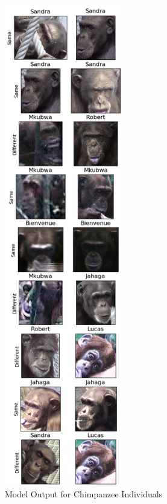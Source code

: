 \documentclass[11pt]{article}
\begin{document}
\begin{figure}
	\begin{center}
    \includegraphics[width=2.0in]{ChimpanzeeComparison.png}
  \caption{Model Output for Chimpanzee Individuals}
  	\end{center}
\end{figure}
\end{document}
